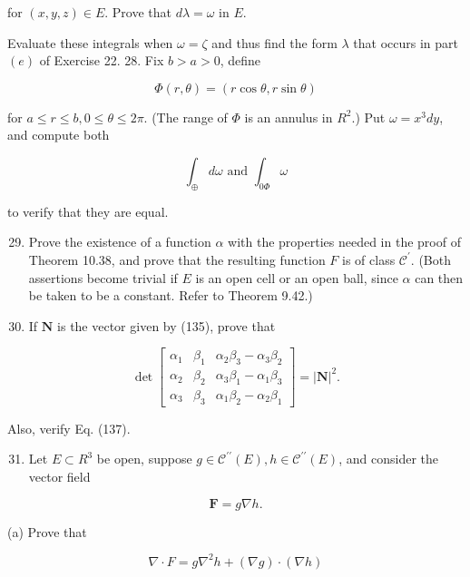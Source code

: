 \documentclass[10pt]{article}
\begin{document}
for $(x, y, z) \in E$. Prove that $d \lambda=\omega$ in $E$.

Evaluate these integrals when $\omega=\zeta$ and thus find the form $\lambda$ that occurs in part $(e)$ of Exercise 22. 28. Fix $b>a>0$, define

$$
\Phi(r, \theta)=(r \cos \theta, r \sin \theta)
$$

for $a \leq r \leq b, 0 \leq \theta \leq 2 \pi$. (The range of $\Phi$ is an annulus in $R^{2}$.) Put $\omega=x^{3} d y$, and compute both

$$
\int_{\oplus} d \omega \text { and } \int_{0 \Phi} \omega
$$

to verify that they are equal.

\begin{enumerate}
  \setcounter{enumi}{28}
  \item Prove the existence of a function $\alpha$ with the properties needed in the proof of Theorem 10.38, and prove that the resulting function $F$ is of class $\mathscr{C}^{\prime}$. (Both assertions become trivial if $E$ is an open cell or an open ball, since $\alpha$ can then be taken to be a constant. Refer to Theorem 9.42.)

  \item If $\mathbf{N}$ is the vector given by (135), prove that

\end{enumerate}

$$
\operatorname{det}\left[\begin{array}{lll}
\alpha_{1} & \beta_{1} & \alpha_{2} \beta_{3}-\alpha_{3} \beta_{2} \\
\alpha_{2} & \beta_{2} & \alpha_{3} \beta_{1}-\alpha_{1} \beta_{3} \\
\alpha_{3} & \beta_{3} & \alpha_{1} \beta_{2}-\alpha_{2} \beta_{1}
\end{array}\right]=|\mathbf{N}|^{2} .
$$

Also, verify Eq. (137).

\begin{enumerate}
  \setcounter{enumi}{30}
  \item Let $E \subset R^{3}$ be open, suppose $g \in \mathscr{C}^{\prime \prime}(E), h \in \mathscr{C}^{\prime \prime}(E)$, and consider the vector field
\end{enumerate}

$$
\mathbf{F}=g \nabla h .
$$

(a) Prove that

$$
\nabla \cdot F=g \nabla^{2} h+(\nabla g) \cdot(\nabla h)
$$
\end{document}
